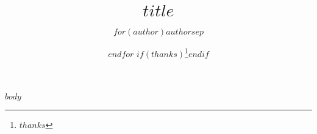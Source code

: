 \documentclass{beamer}
\author{$for(author)$$author$$sep$ \and $endfor$ $if(thanks)$\thanks{$thanks$}$endif$}
\title[$shorttitle$]{$title$}
\begin{document}
$body$
\end{document}
